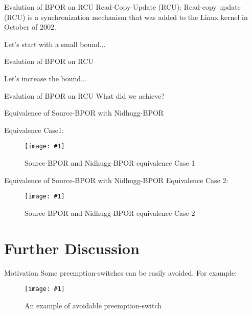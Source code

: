 \documentclass[9pt]{beamer}
\newcommand{\trace}[2]{
\begin{figure}[H]
\centering
\texttt{[image: \#1]}
\caption{#2}
\label{#2}
\end{figure}
}
\newcommand{\bigtabular}[2]{
 \begin{table} 
   \resizebox{\linewidth}{!}{
      
    }
    \caption{#2}
    \label{#2}
 \end{table}
}
\begin{document}
\begin{frame}{Evalution of BPOR on RCU}
Read-Copy-Update (RCU): Read-copy update (RCU) is a synchronization mechanism that was added to the Linux kernel in
October of 2002. 
    
Let's start with a small bound...

\bigtabular{../tables/naivevsbpor1.tex}{RCU results for bound $b=1$}

\end{frame}


\begin{frame}{Evalution of BPOR on RCU}

Let's increase the bound...
\bigtabular{../tables/naivevsbpor4.tex}{RCU results for bound $b=4$}

\end{frame}

\begin{frame}{Evalution of BPOR on RCU}
What did we achieve?

\bigtabular{../tables/dporvsbporpriority.tex}{Comparison between DPOR and BPOR}

\end{frame}

\begin{frame}{Equivalence of Source-BPOR with Nidhugg-BPOR}

    Equivalence Case1:

\trace{../img/equivalence_case1w.pdf}{Source-BPOR and Nidhugg-BPOR equivalence Case 1}
    
\end{frame}

\begin{frame}{Equivalence of Source-BPOR with Nidhugg-BPOR}
    Equivalence Case 2:
   \trace{../img/equivalence_case2.pdf}{Source-BPOR and Nidhugg-BPOR equivalence Case 2}
    
\end{frame}

\section{Further Discussion}

\begin{frame}{Motivation}
Some preemption-switches can be easily avoided. For example:

\trace{../img/motivation.pdf}{An example of avoidable preemption-switch}
    
\end{frame}
\end{document}
